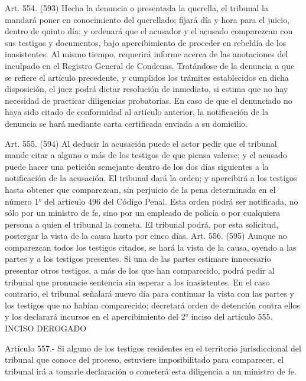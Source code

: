     Art. 554. (593) Hecha la denuncia o presentada la querella, el tribunal la mandará poner en conocimiento del querellado; fijará día y hora para el juicio, dentro de quinto día; y ordenará que el acusador y el acusado comparezcan con sus testigos y documentos, bajo apercibimiento de proceder en rebeldía de los inasistentes.
    Al mismo tiempo, requerirá informe acerca de las anotaciones del inculpado en el Registro General de Condenas.
    Tratándose de la denuncia a que se refiere el artículo precedente, y cumplidos los trámites establecidos en dicha disposición, el juez podrá dictar resolución de inmediato, si estima que no hay necesidad de practicar diligencias probatorias.
    En caso de que el denunciado no haya sido citado de conformidad al artículo anterior, la notificación de la denuncia se hará mediante carta certificada enviada a su domicilio.

    Art. 555. (594) Al deducir la acusación puede el actor pedir que el tribunal mande citar a alguno o más de los testigos de que piensa valerse; y el acusado puede hacer una petición semejante dentro de los dos días siguientes a la notificación de la acusación.
    El tribunal dará la orden; y apercibirá a los testigos hasta obtener que comparezcan, sin perjuicio de la pena determinada en el número 1° del artículo 496 del Código Penal.
    Esta orden podrá ser notificada, no sólo por un ministro de fe, sino por un empleado de policía o por cualquiera persona a quien el tribunal la cometa.
    El tribunal podrá, por esta solicitud, postergar la vista de la causa hasta por cinco días.
    Art. 556. (595) Aunque no comparezcan todos los testigos citados, se hará la vista de la causa, oyendo a las partes y a los testigos presentes.
    Si una de las partes estimare innecesario presentar otros testigos, a más de los que han comparecido, podrá pedir al tribunal que pronuncie sentencia sin esperar a los inasistentes.
    En el caso contrario, el tribunal señalará nuevo día para continuar la vista con las partes y los testigos que no habían comparecido; decretará orden de detención contra ellos y los declarará incursos en el apercibimiento del 2° inciso del artículo 555.
    INCISO DEROGADO

    Artículo 557.- Si alguno de los testigos residentes en el territorio jurisdiccional del tribunal que conoce del proceso, estuviere imposibilitado para comparecer, el tribunal irá a tomarle declaración o cometerá esta diligencia a un ministro de fe.

